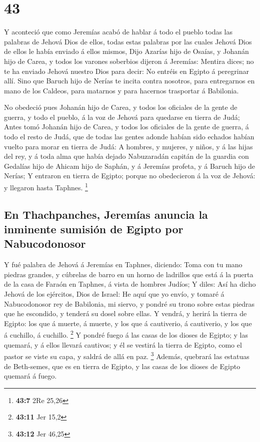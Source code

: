 \hypertarget{section-42}{%
\section{43}\label{section-42}}

 Y aconteció que como Jeremías acabó de hablar á todo el
pueblo todas las palabras de Jehová Dios de ellos, todas estas palabras
por las cuales Jehová Dios de ellos le había enviado á ellos mismos,
 Dijo Azarías hijo de Osaías, y Johanán hijo de Carea, y
todos los varones soberbios dijeron á Jeremías: Mentira dices; no te ha
enviado Jehová nuestro Dios para decir: No entréis en Egipto á
peregrinar allí.  Sino que Baruch hijo de Nerías te incita
contra nosotros, para entregarnos en mano de los Caldeos, para matarnos
y para hacernos trasportar á Babilonia.

 No obedeció pues Johanán hijo de Carea, y todos los
oficiales de la gente de guerra, y todo el pueblo, á la voz de Jehová
para quedarse en tierra de Judá;  Antes tomó Johanán hijo
de Carea, y todos los oficiales de la gente de guerra, á todo el resto
de Judá, que de todas las gentes adonde habían sido echados habían
vuelto para morar en tierra de Judá:  A hombres, y
mujeres, y niños, y á las hijas del rey, y á toda alma que había dejado
Nabuzaradán capitán de la guardia con Gedalías hijo de Ahicam hijo de
Saphán, y á Jeremías profeta, y á Baruch hijo de Nerías; 
Y entraron en tierra de Egipto; porque no obedecieron á la voz de
Jehová: y llegaron hasta Taphnes. \footnote{\textbf{43:7} 2Re 25,26}

\hypertarget{en-thachpanches-jeremuxedas-anuncia-la-inminente-sumisiuxf3n-de-egipto-por-nabucodonosor}{%
\subsection{En Thachpanches, Jeremías anuncia la inminente sumisión de
Egipto por
Nabucodonosor}\label{en-thachpanches-jeremuxedas-anuncia-la-inminente-sumisiuxf3n-de-egipto-por-nabucodonosor}}

 Y fué palabra de Jehová á Jeremías en Taphnes, diciendo:
 Toma con tu mano piedras grandes, y cúbrelas de barro en
un horno de ladrillos que está á la puerta de la casa de Faraón en
Taphnes, á vista de hombres Judíos;  Y diles: Así ha
dicho Jehová de los ejércitos, Dios de Israel: He aquí que yo envío, y
tomaré á Nabucodonosor rey de Babilonia, mi siervo, y pondré su trono
sobre estas piedras que he escondido, y tenderá su dosel sobre ellas.
 Y vendrá, y herirá la tierra de Egipto: los que á
muerte, á muerte, y los que á cautiverio, á cautiverio, y los que á
cuchillo, á cuchillo. \footnote{\textbf{43:11} Jer 15,2} 
Y pondré fuego á las casas de los dioses de Egipto; y las quemará, y á
ellos llevará cautivos; y él se vestirá la tierra de Egipto, como el
pastor se viste su capa, y saldrá de allá en paz. \footnote{\textbf{43:12}
  Jer 46,25}  Además, quebrará las estatuas de
Beth-semes, que es en tierra de Egipto, y las casas de los dioses de
Egipto quemará á fuego.

